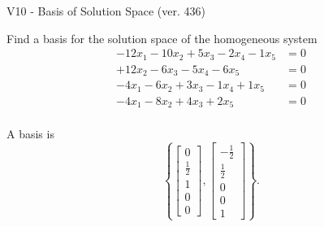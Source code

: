 \begin{exercise}
  \begin{exerciseTitle}V10 - Basis of Solution Space (ver. 436)\end{exerciseTitle}
  \begin{exerciseStatement}
    Find a basis for the solution space of the homogeneous system 
\begin{align*}
 -12 x_ 1 -10 x_ 2 + 5 x_ 3 -2 x_ 4 -1 x_ 5 &= 0  \\ 
  + 12 x_ 2 -6 x_ 3 -5 x_ 4 -6 x_ 5 &= 0  \\ 
  -4 x_ 1 -6 x_ 2 + 3 x_ 3 -1 x_ 4 + 1 x_ 5 &= 0  \\ 
  -4 x_ 1 -8 x_ 2 + 4 x_ 3 + 2 x_ 5 &= 0  \\ 
 \end{align*}


 
  \end{exerciseStatement}

  \begin{exerciseAnswer}
   A basis is   
\[\left\{\left[\begin{array}{c}
0 \\
\frac{1}{2} \\
1 \\
0 \\
0
\end{array}\right] , \left[\begin{array}{c}
-\frac{1}{2} \\
\frac{1}{2} \\
0 \\
0 \\
1
\end{array}\right]\right\}.\]

  


  \end{exerciseAnswer}
\end{exercise}